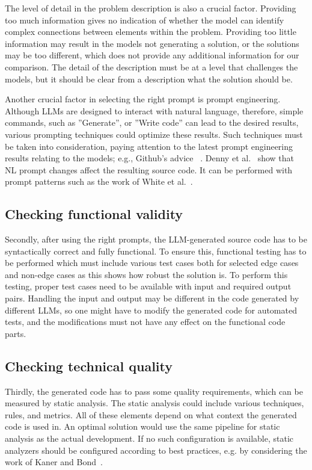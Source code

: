 The level of detail in the problem description is also a crucial factor.
Providing too much information gives no indication of whether the model can identify complex connections between elements within the problem.
Providing too little information may result in the models not generating a solution, or the solutions may be too different, which does not provide any additional information for our comparison.
The detail of the description must be at a level that challenges the models, but it should be clear from a description what the solution should be.

Another crucial factor in selecting the right prompt is prompt engineering.
Although LLMs are designed to interact with natural language, therefore, simple commands, such as ''Generate'', or ''Write code'' can lead to the desired results, various prompting techniques could optimize these results.
Such techniques must be taken into consideration, paying attention to the latest prompt engineering results relating to the models; e.g., Github's advice ~\cite{github_prompt_engineering}.
Denny et al.~\cite{codex_prompting} show that NL prompt changes affect the resulting source code.
It can be performed with prompt patterns such as the work of White et al.~\cite{chatgpt_prompt_design}.

\subsection{Checking functional validity}

Secondly, after using the right prompts, the LLM-generated source code has to be syntactically correct and fully functional.
To ensure this, functional testing has to be performed which must include various test cases both for selected edge cases and non-edge cases as this shows how robust the solution is.
To perform this testing, proper test cases need to be available with input and required output pairs.
Handling the input and output may be different in the code generated by different LLMs, so one might have to modify the generated code for automated tests, and the modifications must not have any effect on the functional code parts.

\subsection{Checking technical quality}

Thirdly, the generated code has to pass some quality requirements, which can be measured by static analysis.
The static analysis could include various techniques, rules, and metrics.
All of these elements depend on what context the generated code is used in.
An optimal solution would use the same pipeline for static analysis as the actual development.
If no such configuration is available, static analyzers should be configured according to best practices, e.g. by considering the work of Kaner and Bond~\cite{why_metrics_not_enough}.

